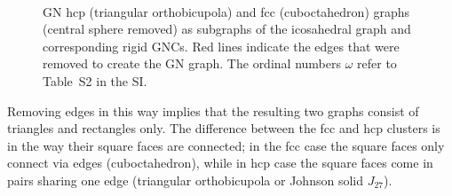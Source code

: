 \begin{figure}[htb]
    \centering
    \\
    \caption{GN hcp (triangular orthobicupola) and fcc (cuboctahedron) graphs
    (central sphere removed) as subgraphs of the icosahedral graph and
    corresponding rigid GNCs.  Red lines indicate the edges that were removed
    to create the GN graph. The ordinal numbers $\omega$ refer to Table~S2 in
    the SI.}
    \label{fig:GNshellgraphs}
\end{figure}
Removing edges in this way implies that the resulting two graphs consist of
triangles and rectangles only. The difference between the fcc and hcp clusters
is in the way their square faces are connected; in the fcc case the square
faces only connect via edges (cuboctahedron), while in hcp case the square
faces come in pairs sharing one edge (triangular orthobicupola or Johnson solid
$J_{27}$)\autocite{Kusner_ConfigurationSpacesEqual_2018}.

